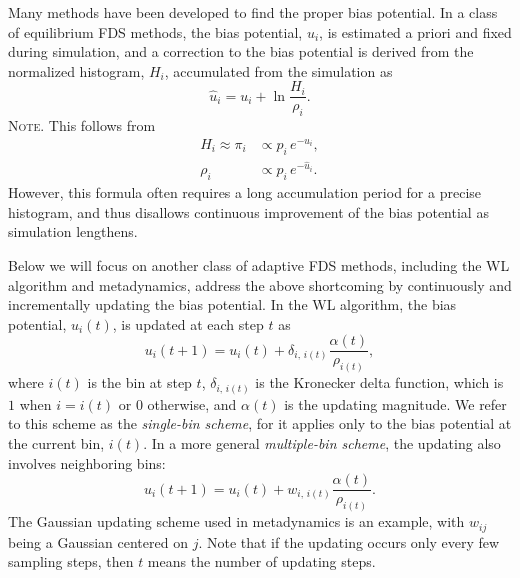\documentclass[preprint, superscriptaddress, floatfix]{revtex4-1}
\newcommand{\note}[1]{{\color{DarkGreen}\footnotesize \textsc{Note.} #1}}
\begin{document}
Many methods\cite{mezei1987, berg1992, *lee1993,
wang2001, wang2001pre, huber1994,
*laio2002, *laio2008, *barducci2011, *sutto2012}
have been developed to find the proper bias potential.
%
In a class of equilibrium FDS methods\cite{
  mezei1987, berg1992, *lee1993, marinari1992, *lyubartsev1992},
the bias potential, $u_i$, is
estimated a priori and fixed
during simulation,
%
and a correction to the bias potential
is derived from the normalized histogram, $H_i$,
accumulated from the simulation as
%
%
\begin{equation}
  \hat u_i
  =
  u_i
  +
  \ln \frac{ H_i }
           { \rho_i }.
  \label{eq:vcorr_equil}
\end{equation}
%
\note{This follows from
  \begin{align*}
    H_i \approx \pi_i
    &\propto p_i \, e^{-u_i},
    \\
    \rho_i
    &\propto p_i \, e^{-\hat u_i}.
  \end{align*}
}
However, this formula often requires a long
accumulation period for a precise histogram,
and thus disallows
continuous improvement of the bias potential
as simulation lengthens.

Below we will focus on another class of adaptive FDS methods,
including the WL algorithm\cite{wang2001, wang2001pre}
and metadynamics\cite{huber1994, laio2002, *laio2008, *barducci2011, *sutto2012},
address the above shortcoming
by continuously and incrementally updating the bias potential.
%
%
In the WL algorithm\cite{wang2001, wang2001pre},
the bias potential, $u_i(t)$, is updated
at each step $t$ as
%
\begin{equation}
  u_i(t+1)
  =
  u_i(t)
  +
  \delta_{i, \, i(t)}
  \frac{ \alpha(t) } { \rho_{i(t)} }
  ,
\label{eq:wl_update}
\end{equation}
%
where $i(t)$ is the bin at step $t$,
$\delta_{i, \, i(t)}$ is the Kronecker delta function,
which is $1$ when $i = i(t)$ or $0$ otherwise,
and $\alpha(t)$ is the updating magnitude.
%
We refer to this scheme as the \emph{single-bin scheme},
for it applies only to the bias potential
at the current bin, $i(t)$.
%
In a more general \emph{multiple-bin scheme},
the updating also involves neighboring bins:
%
\begin{equation}
  u_i(t+1)
  =
  u_i(t)
  +
  w_{i, \, i(t)}
  \frac{ \alpha(t) }
       { \rho_{i(t)} }
  .
  \label{eq:mbin_update}
\end{equation}
%
The Gaussian updating scheme used in metadynamics
is an example, with $w_{ij}$ being a Gaussian centered on $j$.
%
Note that if the updating occurs
only every few sampling steps,
then $t$ means the number of updating steps.
\end{document}

